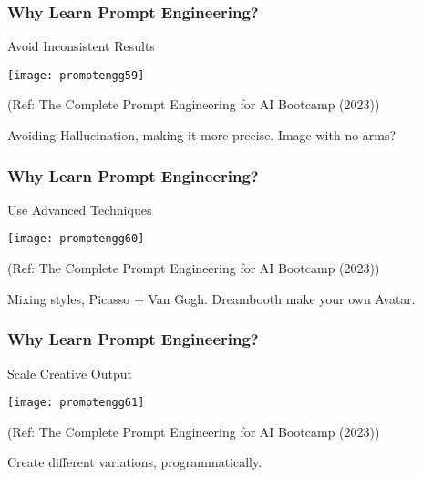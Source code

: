 \begin{frame}[fragile]\frametitle{Why Learn Prompt Engineering?}

Avoid Inconsistent Results

\begin{center}
\texttt{[image: promptengg59]}

{\tiny (Ref: The Complete Prompt Engineering for AI Bootcamp (2023))}

\end{center}	


Avoiding Hallucination, making it more precise. Image with no arms?
			
\end{frame}

\begin{frame}[fragile]\frametitle{Why Learn Prompt Engineering?}

Use Advanced Techniques

\begin{center}
\texttt{[image: promptengg60]}

{\tiny (Ref: The Complete Prompt Engineering for AI Bootcamp (2023))}
\end{center}	

Mixing styles, Picasso + Van Gogh. 
Dreambooth make your own Avatar.
			
\end{frame}

\begin{frame}[fragile]\frametitle{Why Learn Prompt Engineering?}

Scale Creative Output

\begin{center}
\texttt{[image: promptengg61]}

{\tiny (Ref: The Complete Prompt Engineering for AI Bootcamp (2023))}
\end{center}	

Create different variations, programmatically.
			
\end{frame}


